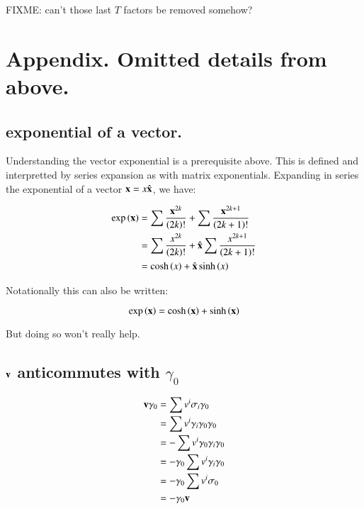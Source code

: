 \documentclass{article}      %
\begin{document}
FIXME: can't those last $T$ factors be removed somehow?

\section{ Appendix. Omitted details from above. }

\subsection{ exponential of a vector. } 

Understanding the vector exponential is a prerequisite above.  This is defined
and interpretted by series expansion as with matrix exponentials.
Expanding
in series the exponential of a vector $\mathbf{x} = x\hat{\mathbf{x}}$, we have:

\begin{align*}
\exp\left(\mathbf{x}\right)
&= \sum \frac{\mathbf{x}^{2k}}{\left(2k\right)!} + \sum \frac{\mathbf{x}^{2k+1}}{\left(2k+1\right)!} \\
&= \sum \frac{x^{2k}}{\left(2k\right)!} + \hat{\mathbf{x}} \sum \frac{x^{2k+1}}{\left(2k+1\right)!} \\
&= \cosh\left(x\right) + \hat{\mathbf{x}} \sinh\left(x\right)
\end{align*}

Notationally this can also be written:

\begin{equation*}
\exp\left(\mathbf{x}\right) = \cosh\left(\mathbf{x}\right) + \sinh\left(\mathbf{x}\right)
\end{equation*}

But doing so won't really help.

\subsection{ $\mathbf{v}$ anticommutes with $\gamma_0$ }

\begin{align*}
\mathbf{v} \gamma_0 
&= \sum v^i \sigma_i \gamma_0 \\
&= \sum v^i \gamma_i \gamma_0 \gamma_0 \\
&= -\sum v^i \gamma_0 \gamma_i \gamma_0 \\
&= - \gamma_0 \sum v^i \gamma_i \gamma_0 \\
&= - \gamma_0 \sum v^i \sigma_0 \\
&= - \gamma_0 \mathbf{v}
\end{align*}
\end{document}
